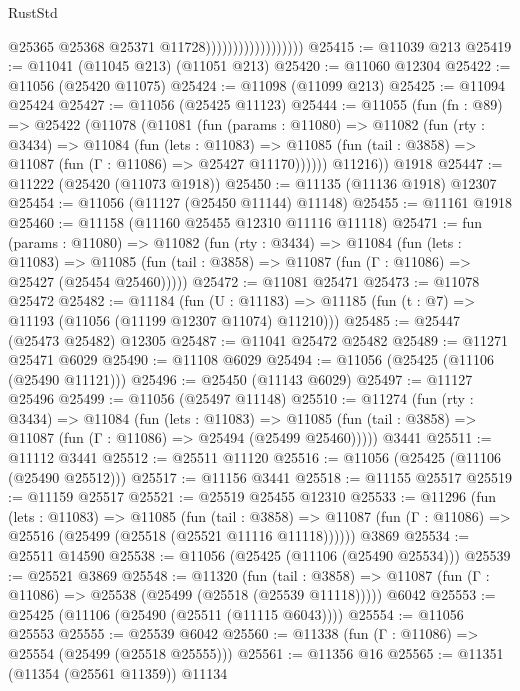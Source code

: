 \begin{lexlean}{RustStd}
\begin{coremodule}
                                        @25365
                                        @25368
                                        @25371
                                        @11728))))))))))))))))))
@25415 := @11039 @213
@25419 := @11041 (@11045 @213) (@11051 @213)
@25420 := @11060 @12304
@25422 := @11056 (@25420 @11075)
@25424 := @11098 (@11099 @213)
@25425 := @11094 @25424
@25427 := @11056 (@25425 @11123)
@25444 := @11055
    (fun (fn : @89) =>
    @25422
      (@11078
        (@11081
          (fun (params : @11080) =>
          @11082
            (fun (rty : @3434) =>
            @11084
              (fun (lets : @11083) =>
              @11085 (fun (tail : @3858) => @11087 (fun (Γ : @11086) => @25427 @11170))))))
        @11216))
    @1918
@25447 := @11222 (@25420 (@11073 @1918))
@25450 := @11135 (@11136 @1918) @12307
@25454 := @11056 (@11127 (@25450 @11144) @11148)
@25455 := @11161 @1918
@25460 := @11158 (@11160 @25455 @12310 @11116 @11118)
@25471 := fun (params : @11080) =>
  @11082
    (fun (rty : @3434) =>
    @11084
      (fun (lets : @11083) =>
      @11085 (fun (tail : @3858) => @11087 (fun (Γ : @11086) => @25427 (@25454 @25460)))))
@25472 := @11081 @25471
@25473 := @11078 @25472
@25482 := @11184
    (fun (U : @11183) => @11185 (fun (t : @7) => @11193 (@11056 (@11199 @12307 @11074) @11210)))
@25485 := @25447 (@25473 @25482) @12305
@25487 := @11041 @25472 @25482
@25489 := @11271 @25471 @6029
@25490 := @11108 @6029
@25494 := @11056 (@25425 (@11106 (@25490 @11121)))
@25496 := @25450 (@11143 @6029)
@25497 := @11127 @25496
@25499 := @11056 (@25497 @11148)
@25510 := @11274
    (fun (rty : @3434) =>
    @11084
      (fun (lets : @11083) =>
      @11085 (fun (tail : @3858) => @11087 (fun (Γ : @11086) => @25494 (@25499 @25460)))))
    @3441
@25511 := @11112 @3441
@25512 := @25511 @11120
@25516 := @11056 (@25425 (@11106 (@25490 @25512)))
@25517 := @11156 @3441
@25518 := @11155 @25517
@25519 := @11159 @25517
@25521 := @25519 @25455 @12310
@25533 := @11296
    (fun (lets : @11083) =>
    @11085
      (fun (tail : @3858) =>
      @11087 (fun (Γ : @11086) => @25516 (@25499 (@25518 (@25521 @11116 @11118))))))
    @3869
@25534 := @25511 @14590
@25538 := @11056 (@25425 (@11106 (@25490 @25534)))
@25539 := @25521 @3869
@25548 := @11320
    (fun (tail : @3858) => @11087 (fun (Γ : @11086) => @25538 (@25499 (@25518 (@25539 @11118)))))
    @6042
@25553 := @25425 (@11106 (@25490 (@25511 (@11115 @6043))))
@25554 := @11056 @25553
@25555 := @25539 @6042
@25560 := @11338 (fun (Γ : @11086) => @25554 (@25499 (@25518 @25555)))
@25561 := @11356 @16
@25565 := @11351 (@11354 (@25561 @11359)) @11134

\end{coremodule}
\end{lexlean}

